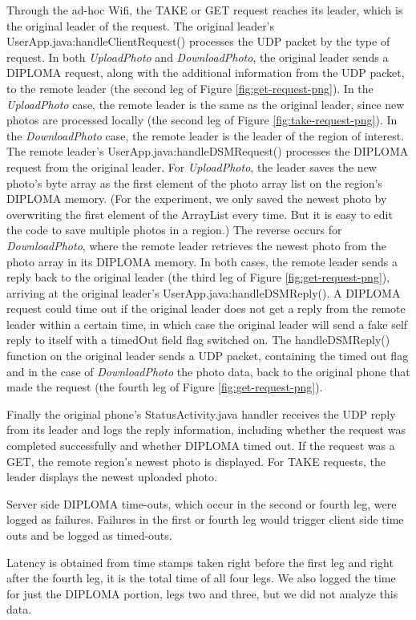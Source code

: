 Through the ad-hoc Wifi, the TAKE or GET request reaches its leader, which is the original leader of the request. The original leader's UserApp.java:handleClientRequest() processes the UDP packet by the type of request. In both {\it UploadPhoto} and {\it DownloadPhoto}, the original leader sends a DIPLOMA request, along with the additional information from the UDP packet, to the remote leader (the second leg of Figure \ref{fig:get-request-png}). In the {\it UploadPhoto} case, the remote leader is the same as the original leader, since new photos are processed locally (the second leg of Figure \ref{fig:take-request-png}). In the {\it DownloadPhoto} case, the remote leader is the leader of the region of interest. The remote leader's UserApp.java:handleDSMRequest() processes the DIPLOMA request from the original leader. For {\it UploadPhoto}, the leader saves the new photo's byte array as the first element of the photo array list on the region's DIPLOMA memory. (For the experiment, we only saved the newest photo by overwriting the first element of the ArrayList every time. But it is easy to edit the code to save multiple photos in a region.) The reverse occurs for {\it DownloadPhoto}, where the remote leader retrieves the newest photo from the photo array in its DIPLOMA memory.  In both cases, the remote leader sends a reply back to the original leader (the third leg of Figure \ref{fig:get-request-png}), arriving at the original leader's UserApp.java:handleDSMReply(). A DIPLOMA request could time out if the original leader does not get a reply from the remote leader within a certain time, in which case the original leader will send a fake self reply to itself with a timedOut field flag switched on. The handleDSMReply() function on the original leader sends a UDP packet, containing the timed out flag and in the case of {\it DownloadPhoto} the photo data, back to the original phone that made the request (the fourth leg of Figure \ref{fig:get-request-png}).

Finally the original phone's StatusActivity.java handler receives the UDP reply from its leader and logs the reply information, including whether the request was completed successfully and whether DIPLOMA timed out. If the request was a GET, the remote region's newest photo is displayed. For TAKE requests, the leader displays the newest uploaded photo.

Server side DIPLOMA time-outs, which occur in the second or fourth leg, were logged as failures. Failures in the first or fourth leg would trigger client side time outs and be logged as timed-outs.

Latency is obtained from time stamps taken right before the first leg and right after the fourth leg, it is the total time of all four legs. We also logged the time for just the DIPLOMA portion, legs two and three, but we did not analyze this data.